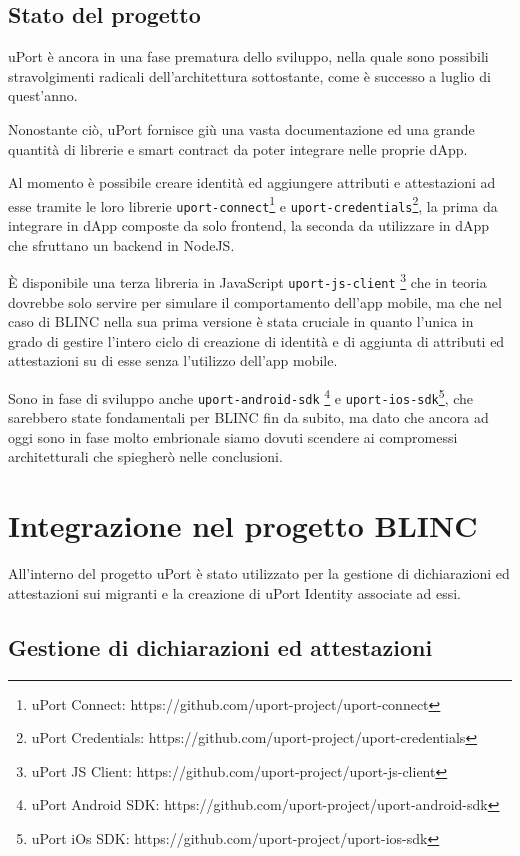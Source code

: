 \subsection{Stato del progetto}

uPort è ancora in una fase prematura dello sviluppo, nella quale sono possibili stravolgimenti radicali
dell'architettura sottostante, come è successo a luglio di quest'anno. \cite{WEBSITE:3}

Nonostante ciò, uPort fornisce giù una vasta documentazione ed una grande quantità di librerie e smart
contract da poter integrare nelle proprie dApp.

Al momento è possibile creare identità ed aggiungere attributi e attestazioni ad esse tramite
le loro librerie \texttt{uport-connect}\footnote{uPort Connect: https://github.com/uport-project/uport-connect}
e \texttt{uport-credentials}\footnote{uPort Credentials: https://github.com/uport-project/uport-credentials},
la prima da integrare in dApp composte da solo frontend, la seconda da utilizzare in dApp che sfruttano
un backend in NodeJS.

\`E disponibile una terza libreria in JavaScript \texttt{uport-js-client}
\footnote{uPort JS Client: https://github.com/uport-project/uport-js-client}
che in teoria dovrebbe solo servire per simulare il comportamento dell'app mobile,
ma che nel caso di BLINC nella sua prima versione è stata cruciale in quanto
l'unica in grado di gestire l'intero ciclo di creazione di identità e di aggiunta di attributi ed
attestazioni su di esse senza l'utilizzo dell'app mobile.

Sono in fase di sviluppo anche \texttt{uport-android-sdk}
\footnote{uPort Android SDK: https://github.com/uport-project/uport-android-sdk}
e \texttt{uport-ios-sdk}\footnote{uPort iOs SDK: https://github.com/uport-project/uport-ios-sdk}, che sarebbero
state fondamentali per BLINC fin da subito, ma dato che ancora ad oggi sono in fase molto embrionale
siamo dovuti scendere ai compromessi architetturali che spiegherò nelle conclusioni.

\section{Integrazione nel progetto BLINC}

All’interno del progetto uPort è stato utilizzato per la gestione di dichiarazioni
ed attestazioni sui migranti e la creazione di uPort Identity associate ad essi.

\subsection{Gestione di dichiarazioni ed attestazioni}

